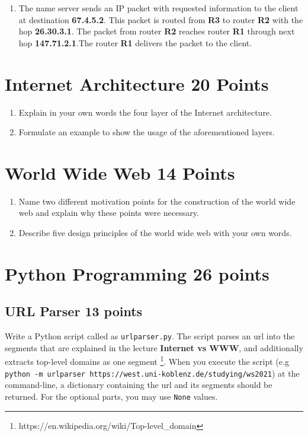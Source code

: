 \documentclass{resources/WeSTassignment}
\begin{document}
\begin{enumerate}
\item The name server sends an IP packet with requested information to the client at destination \textbf{67.4.5.2}. This packet is routed from \textbf{R3} to router \textbf{R2} with the hop \textbf{26.30.3.1}. The packet from router \textbf{R2} reaches router \textbf{R1} through next hop \textbf{147.71.2.1}.The router \textbf{R1} delivers the packet to the client.

\end{enumerate}

	
\section{Internet Architecture \hfill{20 Points}}
\begin{enumerate}
    \item Explain in your own words the four layer of the Internet architecture.
    \item Formulate an example to show the usage of the aforementioned layers.
\end{enumerate}

\section{World Wide Web \hfill{14 Points}}
\begin{enumerate}
    \item Name two different motivation points for the construction of the world wide web and explain why these points were necessary.
    \item Describe five design principles of the world wide web with your own words. 
\end{enumerate}

\section{Python Programming \hfill{26 points}}
\subsection{URL Parser \hfill{13 points}\label{url_parser}}
Write a Python script called as \texttt{urlparser.py}. The script parses an url into the segments that are explained in the lecture \textbf{Internet vs WWW}, and additionally extracts top-level domains as one segment \footnote{https://en.wikipedia.org/wiki/Top-level\_domain}. When you execute the script (e.g \texttt{python -m urlparser https://west.uni-koblenz.de/studying/ws2021}) at the command-line, a dictionary containing the url and its segments should be returned. For the optional parts, you may use \texttt{None} values. 
\end{document}
